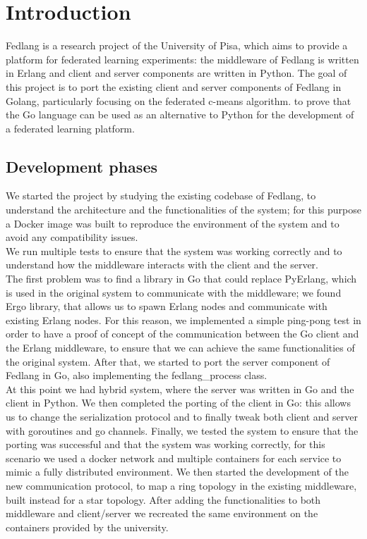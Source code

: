 \chapter{Introduction}
Fedlang is a research project of the University of Pisa, which aims to provide a platform for federated learning experiments:
the middleware of Fedlang is written in Erlang and client and server components are written in Python.
The goal of this project is to port the existing client and server components of Fedlang in Golang, particularly focusing on the federated c-means algorithm.
to prove that the Go language can be used as an alternative to Python for the development of a federated learning platform.

\section{Development phases}
We started the project by studying the existing codebase of Fedlang, to understand the architecture and the functionalities of the system; for this purpose a Docker image was built to reproduce the environment of the system and to avoid any compatibility issues.\\ We run multiple tests to ensure that the system was working correctly and to understand how the middleware interacts with the client and the server.\\ The first problem was to find a library in Go that could replace PyErlang, which is used in the original system to communicate with the middleware; we found Ergo library, that allows us to spawn Erlang nodes and communicate with existing Erlang nodes. For this reason, we implemented a simple ping-pong test in order to have a proof of concept of the communication between the Go client and the Erlang middleware, to ensure that we can achieve the same functionalities of the original system. After that, we started to port the server component of Fedlang in Go, also implementing the fedlang\_process class. \\ At this point we had hybrid system, where the server was written in Go and the client in Python. We then completed the porting of the client in Go: this allows us to change the serialization protocol and 
to finally tweak both client and server with goroutines and go channels.
Finally, we tested the system to ensure that the porting was successful and that the system was working correctly, for this scenario we used a docker network and multiple containers 
for each service to mimic a fully distributed environment.
We then started the development of the new communication protocol, to map a ring topology in the existing middleware, built instead for a star topology.
After adding the functionalities to both middleware and client/server we recreated the same environment on the containers provided by the university. 
